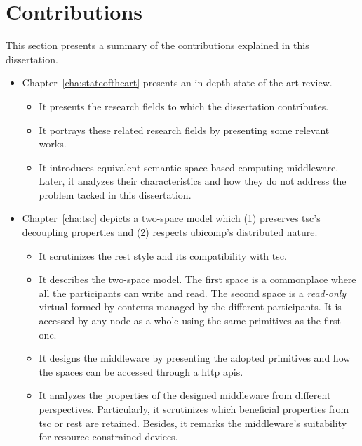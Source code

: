 \section{Contributions}



This section presents a summary of the contributions explained in this dissertation.
\begin{itemize}
  \item Chapter~\ref{cha:stateoftheart} presents an in-depth state-of-the-art review.
    \begin{itemize}
      \item It presents the research fields to which the dissertation contributes.
      \item It portrays these related research fields by presenting some relevant works.
      \item It introduces equivalent semantic space-based computing middleware.
	    Later, it analyzes their characteristics and how they do not address the problem tacked in this dissertation.
    \end{itemize}
  
  \item Chapter~\ref{cha:tsc} depicts a two-space model which (1) preserves \ac{tsc}'s decoupling properties and (2) respects \ac{ubicomp}'s distributed nature.
    \begin{itemize}
      \item It scrutinizes the \ac{rest} style and its compatibility with \ac{tsc}.
      \item It describes the two-space model. %
            The first space is a commonplace where all the participants can write and read.
            The second space is a \emph{read-only} virtual \Space{} formed by contents managed by the different participants.
            It is accessed by any node as a whole using the same primitives as the first one.
      \item It designs the middleware by presenting the adopted primitives and how the spaces can be accessed through a \ac{http} \acp{api}.
      \item It analyzes the properties of the designed middleware from different perspectives.
	    Particularly, it scrutinizes which beneficial properties from \ac{tsc} or \ac{rest} are retained.
	    Besides, it remarks the middleware's suitability for resource constrained devices.
    \end{itemize}
  

\end{itemize}
